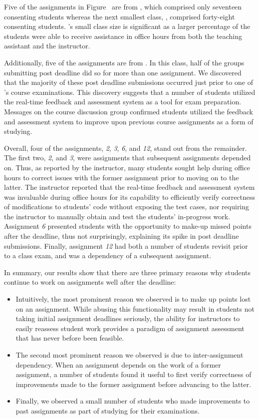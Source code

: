 Five of the assignments in Figure~ are from ,
which comprised only seventeen consenting students whereas the next smallest
class, , comprised forty-eight consenting students. 's
small class size is significant as a larger percentage of the students were
able to receive assistance in office hours from both the teaching assistant and
the instructor.

Additionally, five of the assignments are from . In this class, half
of the groups submitting post deadline did so for more than one assignment. We
discovered that the majority of these post deadline submissions occurred just
prior to one of 's course examinations. This discovery suggests that
a number of students utilized the real-time feedback and assessment system as a
tool for exam preparation. Messages on the course discussion group confirmed
students utilized the feedback and assessment system to improve upon previous
course assignments as a form of studying.

Overall, four of the assignments, \emph{2}, \emph{3}, \emph{6}, and \emph{12},
stand out from the remainder. The first two, \emph{2}, and \emph{3}, were
assignments that subsequent assignments depended on. Thus, as reported by the
instructor, many students sought help during office hours to correct issues
with the former assignment prior to moving on to the latter. The instructor
reported that the real-time feedback and assessment system was invaluable
during office hours for its capability to efficiently verify correctness of
modifications to students' code without exposing the test cases, nor requiring
the instructor to manually obtain and test the students' in-progress
work. Assignment \emph{6} presented students with the opportunity to make-up
missed points after the deadline, thus not surprisingly, explaining its spike
in post deadline submissions. Finally, assignment \emph{12} had both a number
of students revisit prior to a class exam, and was a dependency of a subsequent
assignment.

In summary, our results show that there are three primary reasons why students
continue to work on assignments well after the deadline:

\begin{itemize}
\item Intuitively, the most prominent reason we observed is to make up points
  lost on an assignment. While abusing this functionality may result in
  students not taking initial assignment deadlines seriously, the ability for
  instructors to easily reassess student work provides a paradigm of assignment
  assessment that has never before been feasible.
\item The second most prominent reason we observed is due to inter-assignment
  dependency. When an assignment depends on the work of a former assignment, a
  number of students found it useful to first verify correctness of
  improvements made to the former assignment before advancing to the latter.
\item Finally, we observed a small number of students who made improvements to
  past assignments as part of studying for their examinations.
\end{itemize}

